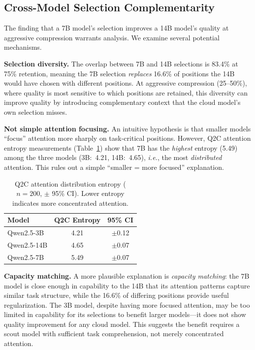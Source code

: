 \documentclass[conference]{IEEEtran}
\newcommand{\ie}{\textit{i.e.}\xspace}
\begin{document}
\subsection{Cross-Model Selection Complementarity}
\label{sec:attention_focusing}

The finding that a 7B model's selection improves a 14B model's quality at aggressive compression warrants analysis.
We examine several potential mechanisms.

\textbf{Selection diversity.}
The overlap between 7B and 14B selections is 83.4\% at 75\% retention, meaning the 7B selection \emph{replaces} 16.6\% of positions the 14B would have chosen with different positions.
At aggressive compression (25--50\%), where quality is most sensitive to which positions are retained, this diversity can improve quality by introducing complementary context that the cloud model's own selection misses.

\textbf{Not simple attention focusing.}
An intuitive hypothesis is that smaller models ``focus'' attention more sharply on task-critical positions.
However, Q2C attention entropy measurements (Table~\ref{tab:entropy}) show that 7B has the \emph{highest} entropy (5.49) among the three models (3B:~4.21, 14B:~4.65), \ie, the most \emph{distributed} attention.
This rules out a simple ``smaller = more focused'' explanation.

\begin{table}[t]
\centering
\caption{Q2C attention distribution entropy ($n = 200$, $\pm$ 95\% CI). Lower entropy indicates more concentrated attention.}
\label{tab:entropy}
\small
\begin{tabular}{@{}lcc@{}}
\toprule
\textbf{Model} & \textbf{Q2C Entropy} & \textbf{95\% CI} \\
\midrule
Qwen2.5-3B  & 4.21 & $\pm$0.12 \\
Qwen2.5-14B & 4.65 & $\pm$0.07 \\
Qwen2.5-7B  & 5.49 & $\pm$0.07 \\
\bottomrule
\end{tabular}
\end{table}

\textbf{Capacity matching.}
A more plausible explanation is \emph{capacity matching}: the 7B model is close enough in capability to the 14B that its attention patterns capture similar task structure, while the 16.6\% of differing positions provide useful regularization.
The 3B model, despite having more focused attention, may be too limited in capability for its selections to benefit larger models---it does not show quality improvement for any cloud model.
This suggests the benefit requires a scout model with sufficient task comprehension, not merely concentrated attention.
\end{document}
